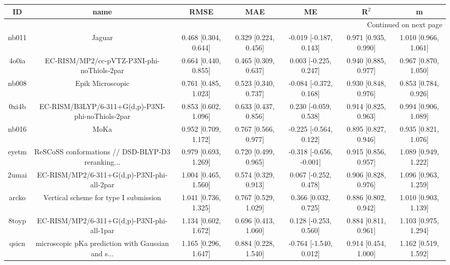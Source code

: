 \documentclass{article}
\begin{document}
\begin{center}
\begin{longtable}{|ccccccc|}
\toprule
    ID &                                               name &                  RMSE &                   MAE &                       ME &                 R$^2$ &                     m \\
\midrule
\endhead
\midrule
\multicolumn{7}{r}{{Continued on next page}} \\
\midrule
\endfoot

\bottomrule
\endlastfoot
 nb011 &                                             Jaguar &  0.468 [0.304, 0.644] &  0.329 [0.224, 0.456] &   -0.019 [-0.187, 0.143] &  0.971 [0.935, 0.990] &  1.010 [0.966, 1.061] \\
 4o0ia &         EC-RISM/MP2/cc-pVTZ-P3NI-phi-noThiols-2par &  0.664 [0.440, 0.855] &  0.465 [0.309, 0.637] &    0.003 [-0.225, 0.247] &  0.940 [0.885, 0.977] &  0.967 [0.870, 1.050] \\
 nb008 &                                   Epik Microscopic &  0.761 [0.485, 1.023] &  0.523 [0.340, 0.737] &   -0.084 [-0.372, 0.168] &  0.930 [0.848, 0.976] &  0.853 [0.784, 0.926] \\
 0xi4b &  EC-RISM/B3LYP/6-311+G(d,p)-P3NI-phi-noThiols-2par &  0.853 [0.602, 1.096] &  0.633 [0.437, 0.856] &    0.230 [-0.059, 0.538] &  0.914 [0.825, 0.963] &  0.994 [0.906, 1.089] \\
 nb016 &                                               MoKa &  0.952 [0.709, 1.172] &  0.767 [0.566, 0.977] &   -0.225 [-0.564, 0.122] &  0.895 [0.827, 0.946] &  0.935 [0.821, 1.076] \\
 eyetm &  ReSCoSS conformations // DSD-BLYP-D3 reranking... &  0.979 [0.693, 1.269] &  0.720 [0.499, 0.965] &  -0.318 [-0.656, -0.001] &  0.915 [0.856, 0.957] &  1.089 [0.949, 1.222] \\
 2umai &         EC-RISM/MP2/6-311+G(d,p)-P3NI-phi-all-2par &  1.004 [0.465, 1.560] &  0.574 [0.329, 0.913] &    0.067 [-0.252, 0.478] &  0.906 [0.828, 0.976] &  1.096 [0.963, 1.259] \\
 arcko &              Vertical scheme for type I submission &  1.041 [0.736, 1.325] &  0.767 [0.529, 1.029] &     0.366 [0.032, 0.725] &  0.886 [0.802, 0.942] &  1.010 [0.903, 1.139] \\
 8toyp &         EC-RISM/MP2/6-311+G(d,p)-P3NI-phi-all-1par &  1.134 [0.602, 1.672] &  0.696 [0.413, 1.060] &    0.128 [-0.253, 0.560] &  0.884 [0.811, 0.961] &  1.103 [0.975, 1.294] \\
 qsicn &  microscopic pKa prediction with Gaussian and s... &  1.165 [0.296, 1.647] &  0.884 [0.228, 1.540] &   -0.764 [-1.540, 0.012] &  0.914 [0.454, 1.000] &  1.162 [0.519, 1.592] \\

\end{longtable}
\end{center}
\end{document}
